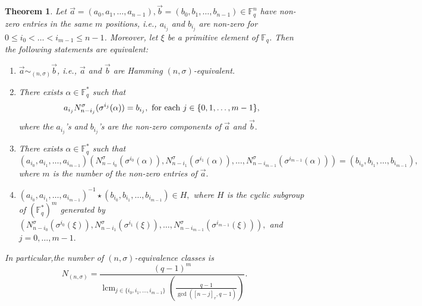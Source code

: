 \documentclass[12pt,paper]{article}
\theoremstyle{plain}
\newtheorem{theorem}{Theorem}[section] %
\newcommand{\Fq}{\mathbb{F}_{q}}
\DeclareMathOperator{\lcm}{lcm}
\begin{document}
\begin{theorem}\label{Th_general}
Let $ \vec{a}=(a_0,a_1,\ldots, a_{n-1}), \vec{b}=(b_0,b_1,\ldots, b_{n-1})\in \mathbb{F}_q^{n}$ have non-zero entries in the same $m$ positions, i.e., $a_{i_j}$ and $b_{i_j}$ are non-zero  for $0\leq i_0<\dots<i_{m-1}\leq n-1$. Moreover, let $\xi $ be a primitive element of $\Fq$. Then the following statements are equivalent:
\begin{enumerate}
\item $ \vec{a} \sim_{(n,\sigma)} \vec{b}$,  i.e., $ \vec{a} $ and  $ \vec{b}$ are  Hamming $ (n,\sigma)$-equivalent. 

\item   There exists $\alpha\in \Fq^*$ such that 
 $$  a_{i_j} N^{\sigma}_{n-i_j}(\sigma^{i_j}(\alpha)) = b_{i_j}, \   \text{for  each $ j \in \{0,1,\ldots,m-1\}$,}$$   where the  $ a_{i_j}$'s and $  b_{i_j}$'s are the non-zero components of $\vec{a}$ and $\vec{b}.$
 
 \item  There exists $\alpha\in \Fq^*$ such that 
 $$ (a_{i_0}, a_{i_1},\ldots, a_{i_{m-1}}) \left( N^{\sigma}_{n-i_0}(\sigma^{i_0}(\alpha)), N^{\sigma}_{n-i_1}(\sigma^{i_1}(\alpha)) , \ldots, N^{\sigma}_{n-i_{m-1}}(\sigma^{i_{m-1}}(\alpha))\right)=  ( b_{i_0}, b_{i_1},\ldots, b_{i_{m-1}}),$$
 where $m$ is the number of the non-zero entries  of $\vec{a}.$
\item $ (a_{i_0}, a_{i_1},\ldots, a_{i_{m-1}})^{-1}\star ( b_{i_0}, b_{i_1},\ldots, b_{i_{m-1}}) \in H,$ where $H$ is the cyclic subgroup of $ (\Fq^*)^m$ generated by 
$  \left( N^{\sigma}_{n-i_0}(\sigma^{i_0}(\xi)), N^{\sigma}_{n-i_1}(\sigma^{i_1}(\xi)) , \ldots, N^{\sigma}_{n-i_{m-1}}(\sigma^{i_{m-1}}(\xi))\right),$  and   $j=0,\ldots,m-1.$
\end{enumerate}
In particular,the number of $(n,\sigma)$-equivalence classes is
$$ N_{(n,\sigma)}=\dfrac{ (q-1)^m}{ \lcm_{ j\in \{i_0,i_1,\ldots, i_{m-1} \} }\left(\frac{q-1}{ \gcd([n-j]_r,q-1)}\right)}. $$
\end{theorem}
\end{document}
